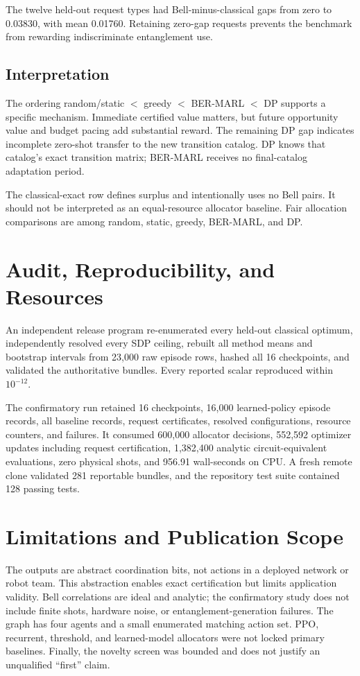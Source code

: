 \documentclass[10pt,twocolumn]{article}
\newcommand{\method}{\textsc{BER-MARL}}
\begin{document}
The twelve held-out request types had Bell-minus-classical gaps from zero to 0.03830, with mean 0.01760. Retaining zero-gap requests prevents the benchmark from rewarding indiscriminate entanglement use.

\subsection{Interpretation}
The ordering random/static $<$ greedy $<$ \method{} $<$ DP supports a specific mechanism. Immediate certified value matters, but future opportunity value and budget pacing add substantial reward. The remaining DP gap indicates incomplete zero-shot transfer to the new transition catalog. DP knows that catalog's exact transition matrix; \method{} receives no final-catalog adaptation period.

The classical-exact row defines surplus and intentionally uses no Bell pairs. It should not be interpreted as an equal-resource allocator baseline. Fair allocation comparisons are among random, static, greedy, \method, and DP.

\section{Audit, Reproducibility, and Resources}
An independent release program re-enumerated every held-out classical optimum, independently resolved every SDP ceiling, rebuilt all method means and bootstrap intervals from 23,000 raw episode rows, hashed all 16 checkpoints, and validated the authoritative bundles. Every reported scalar reproduced within $10^{-12}$.

The confirmatory run retained 16 checkpoints, 16,000 learned-policy episode records, all baseline records, request certificates, resolved configurations, resource counters, and failures. It consumed 600,000 allocator decisions, 552,592 optimizer updates including request certification, 1,382,400 analytic circuit-equivalent evaluations, zero physical shots, and 956.91 wall-seconds on CPU. A fresh remote clone validated 281 reportable bundles, and the repository test suite contained 128 passing tests.

\section{Limitations and Publication Scope}
The outputs are abstract coordination bits, not actions in a deployed network or robot team. This abstraction enables exact certification but limits application validity. Bell correlations are ideal and analytic; the confirmatory study does not include finite shots, hardware noise, or entanglement-generation failures. The graph has four agents and a small enumerated matching action set. PPO, recurrent, threshold, and learned-model allocators were not locked primary baselines. Finally, the novelty screen was bounded and does not justify an unqualified ``first'' claim.
\end{document}

